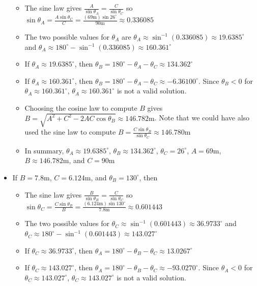 \documentclass{article}
\begin{document}
\begin{itemize}
	\begin{itemize}
	\item[\textasteriskcentered] The sine law gives \(\frac{A}{\sin\theta_A} = \frac{C}{\sin\theta_C}\) so \(\sin\theta_A = \frac{A\sin\theta_C}{C} = \frac{(69\text{m})\sin 26^\circ}{90\text{m}} \approx 0.336085\)
	\item[\textasteriskcentered] The two possible values for \(\theta_A\) are \(\theta_A \approx \sin^{-1}(0.336085) \approx 19.6385^\circ\) and \(\theta_A \approx 180^\circ - \sin^{-1}(0.336085) \approx 160.361^\circ\)
	\item[\textasteriskcentered] If \(\theta_A \approx 19.6385^\circ\), then \(\theta_B = 180^\circ - \theta_A - \theta_C \approx 134.362^\circ\) 
	\item[\textasteriskcentered] If \(\theta_A \approx 160.361^\circ\), then \(\theta_B = 180^\circ - \theta_A - \theta_C \approx -6.36100^\circ\). Since \(\theta_B < 0\) for \(\theta_A \approx 160.361^\circ\), \(\theta_A \approx 160.361^\circ\) is not a valid solution.  
	\item[\textasteriskcentered] Choosing the cosine law to compute \(B\) gives \(B = \sqrt{A^2 + C^2 - 2AC\cos\theta_B} \approx 146.782\text{m}\). Note that we could have also used the sine law to compute \(B = \frac{C\sin\theta_B}{\sin\theta_C} \approx 146.780\text{m}\)
	\item[\textasteriskcentered] In summary, \(\theta_A \approx 19.6385^\circ\), \(\theta_B \approx 134.362^\circ\), \(\theta_C = 26^\circ\), \(A = 69\text{m}\), \(B \approx 146.782\text{m}\), and \(C = 90\text{m}\)
	\end{itemize}
\item If \(B = 7.8\text{m}\), \(C = 6.124\text{m}\), and \(\theta_B = 130^\circ\), then 
	\begin{itemize}
	\item[\textasteriskcentered] The sine law gives \(\frac{B}{\sin\theta_B} = \frac{C}{\sin\theta_C}\) so \(\sin\theta_C = \frac{C\sin\theta_B}{B} = \frac{(6.124\text{m})\sin 130^\circ}{7.8\text{m}} \approx 0.601443\) 
	\item[\textasteriskcentered] The two possible values for \(\theta_C \approx \sin^{-1}(0.601443) \approx 36.9733^\circ\) and \(\theta_C \approx 180^\circ - \sin^{-1}(0.601443) \approx 143.027^\circ\)
	\item[\textasteriskcentered] If \(\theta_C \approx 36.9733^\circ\), then \(\theta_A = 180^\circ - \theta_B - \theta_C \approx 13.0267^\circ\)
	\item[\textasteriskcentered] If \(\theta_C \approx 143.027^\circ\), then \(\theta_A = 180^\circ - \theta_B - \theta_C \approx -93.0270^\circ\). Since \(\theta_A < 0\) for \(\theta_C \approx 143.027^\circ\), \(\theta_C \approx 143.027^\circ\) is not a valid solution.  

\end{itemize}
\end{itemize}
\end{document}

